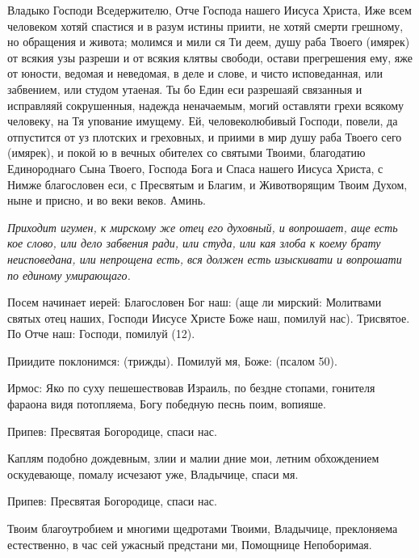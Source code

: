 Владыко Господи Вседержителю, Отче Господа нашего Иисуса Христа, Иже всем человеком хотяй спастися и в разум истины приити, не хотяй смерти грешному, но обращения и живота; молимся и мили ся Ти деем, душу раба Твоего (имярек) от всякия узы разреши и от всякия клятвы свободи, остави прегрешения ему, яже от юности, ведомая и неведомая, в деле и слове, и чисто исповеданная, или забвением, или студом утаеная. Ты бо Един еси разрешаяй связанныя и исправляяй сокрушенныя, надежда неначаемым, могий оставляти грехи всякому человеку, на Тя упование имущему. Ей, человеколюбивый Господи, повели, да отпустится от уз плотских и греховных, и приими в мир душу раба Твоего сего (имярек), и покой ю в вечных обителех со святыми Твоими, благодатию Единороднаго Сына Твоего, Господа Бога и Спаса нашего Иисуса Христа, с Нимже благословен еси, с Пресвятым и Благим, и Животворящим Твоим Духом, ныне и присно, и во веки веков. Аминь.
\mychapterending

 


\itshape Приходит игумен, к мирскому же отец его духовный, и вопрошает, аще есть кое слово, или дело забвения ради, или студа, или кая злоба к коему брату неисповедана, или непрощена есть, вся должен есть изыскивати и вопрошати по единому умирающаго.\normalfont{}


Посем начинает иерей: Благословен Бог наш: (аще ли мирский: Молитвами святых отец наших, Господи Иисусе Христе Боже наш, помилуй нас). Трисвятое. По Отче наш: Господи, помилуй (12).


Приидите поклонимся: (трижды). Помилуй мя, Боже: (псалом 50).




Ирмос: Яко по суху пешешествовав Израиль, по бездне стопами, гонителя фараона видя потопляема, Богу победную песнь поим, вопияше.


\medskip


Припев: Пресвятая Богородице, спаси нас.


Каплям подобно дождевным, злии и малии дние мои, летним обхождением оскудевающе, помалу исчезают уже, Владычице, спаси мя.


Припев: Пресвятая Богородице, спаси нас.


Твоим благоутробием и многими щедротами Твоими, Владычице, преклоняема естественно, в час сей ужасный предстани ми, Помощнице Непоборимая.


